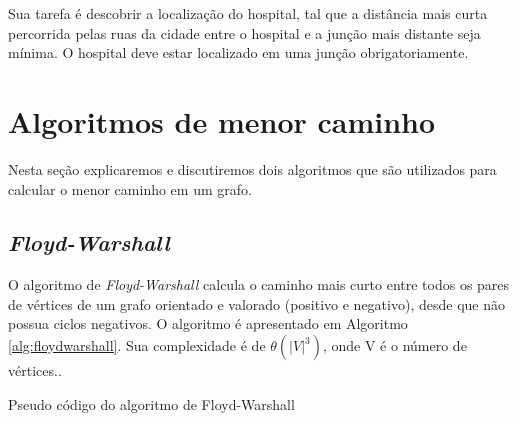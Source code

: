 \documentclass[11pt,twoside]{article}
\begin{document}
        Sua tarefa é descobrir a localização do hospital, tal que a distância mais curta percorrida
        pelas ruas da cidade entre o hospital e a junção mais distante seja mínima.
        O hospital deve estar localizado em uma junção obrigatoriamente.
        


\section{Algoritmos de menor caminho}

    Nesta seção explicaremos e discutiremos dois algoritmos que são utilizados para calcular o menor
    caminho em um grafo.

    \subsection{{\it Floyd-Warshall}}
    
        O algoritmo de {\it Floyd-Warshall} calcula o caminho mais curto entre todos os pares de vértices de
        um grafo orientado e valorado (positivo e negativo), desde que não possua ciclos negativos.
        O algoritmo é apresentado em Algoritmo \ref{alg:floydwarshall}. Sua complexidade é de 
        $\theta(|V|^3)$\cite{pallottino1984}, onde V é o número de vértices..

        \begin{algorithm}[ht]
            
            
            
            \caption{Pseudo código do algoritmo de Floyd-Warshall}
            \label{alg:floydwarshall}
        \end{algorithm}
    
\end{document}
